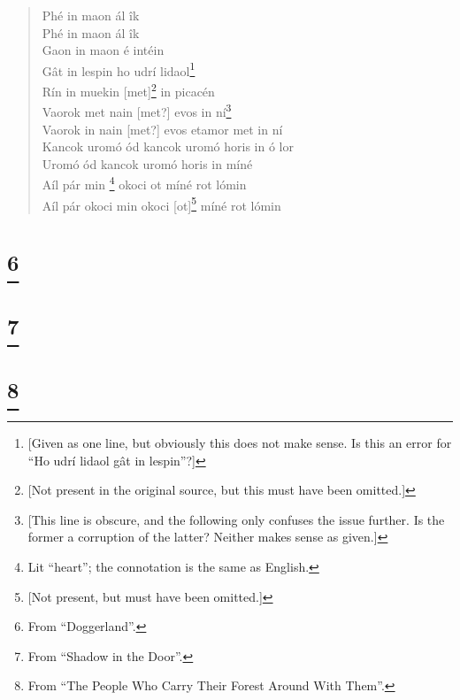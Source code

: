 \documentclass{article}
\let\oldthefootnote\thefootnote
\newcommand\oocfootnote[2][DarkGreen]{\renewcommand\thefootnote{\color{#1}\oldthefootnote}%
  \footnote{\color{#1}#2}%
  \renewcommand{\thefootnote}{\oldthefootnote}}
\begin{document}
\begin{verse}
Phé in maon ál îk \\
Phé in maon ál îk \\
Gaon in maon é intéin \\
Gât in lespin ho udrí lidaol\footnote{[Given as one line, but obviously this does not make sense. Is this an error for ``Ho udrí lidaol gât in lespin''?]} \\
Rín in muekin [met]\footnote{[Not present in the original source, but this must have been omitted.]} in picacén \\
Vaorok met nain [met?] evos in ní\footnote{[This line is obscure, and the following only confuses the issue further. Is the former a corruption of the latter? Neither makes sense as given.]} \\
Vaorok in nain [met?] evos etamor met in ní \\
Kancok uromó ód kancok uromó horis in ó lor \\
Uromó ód kancok uromó horis in míné \\
Aíl pár min\oocfootnote{Lit ``heart''; the connotation is the same as English.} okoci ot míné rot lómin \\
Aíl pár okoci min okoci [ot]\footnote{[Not present, but must have been omitted.]} míné rot lómin \\

\end{verse}

\section{\oocfootnote{From ``Doggerland''.}}


\begin{verse}
\end{verse}


\section{\oocfootnote{From ``Shadow in the Door''.}}


\begin{verse}
\end{verse}


\section{\oocfootnote{From ``The People Who Carry Their Forest Around With Them''.}}
\end{document}
